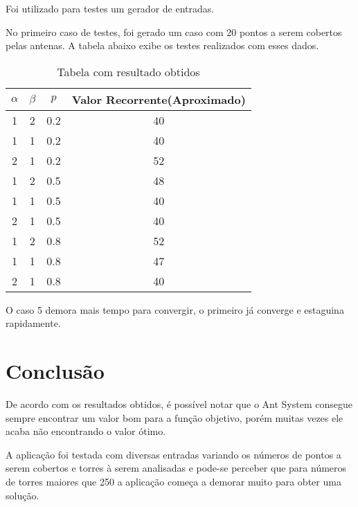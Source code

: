 \documentclass[12pt]{article}
\begin{document}
Foi utilizado para testes um gerador de entradas.

No primeiro caso de testes, foi gerado um caso com 20 pontos a serem cobertos
pelas antenas. A tabela abaixo exibe os testes realizados com esses dados.
\begin{table}

\centering

\caption{Tabela com resultado obtidos}
\begin{tabular}{cccc}

\hline
$\alpha$ & $\beta$ & $p$ & Valor Recorrente(Aproximado)\\

\hline
\hline

1 & 2 & 0.2 & 40 \\
1 & 1 & 0.2 & 40 \\
2 & 1 & 0.2 & 52 \\
1 & 2 & 0.5 & 48 \\
1 & 1 & 0.5 & 40 \\
2 & 1 & 0.5 & 40 \\
1 & 2 & 0.8 & 52 \\
1 & 1 & 0.8 & 47 \\
2 & 1 & 0.8 & 40 \\

\hline
\end{tabular}
\label{tab}
\end{table}
O caso 5 demora mais tempo para convergir, o primeiro já converge e estaguina rapidamente.
\section{Conclusão}

De acordo com os resultados obtidos, é possível notar que
o Ant System consegue sempre encontrar um valor bom para 
a função objetivo, porém muitas vezes ele acaba não encontrando 
o valor ótimo.

A aplicação foi testada com diversas entradas variando os números de pontos 
a serem cobertos e torres à serem analisadas e pode-se perceber que
para números de torres maiores que 250 a aplicação começa a demorar muito
para obter uma solução.
\end{document}
